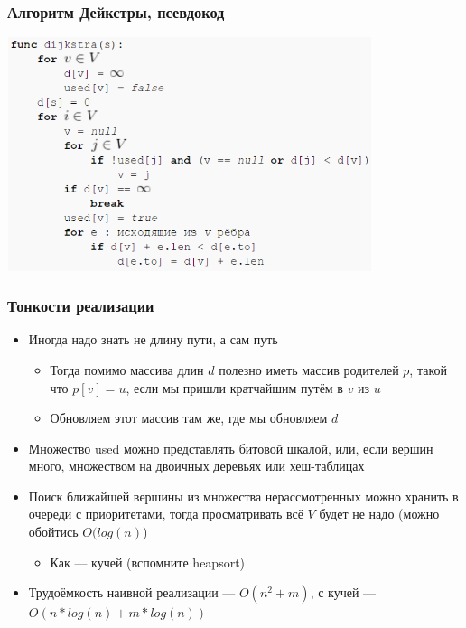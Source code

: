 \documentclass[xetex,mathserif,serif]{beamer}
\begin{document}
	\begin{frame}[fragile]
		\frametitle{Алгоритм Дейкстры, псевдокод}
		\begin{center}
			\includegraphics[width=0.8\textwidth]{dijkstra-pseudocode.png}
		\end{center}
	\end{frame}

	\begin{frame}
		\frametitle{Тонкости реализации}
		\begin{itemize}
			\item Иногда надо знать не длину пути, а сам путь
			\begin{itemize}
				\item Тогда помимо массива длин $d$ полезно иметь массив родителей $p$, такой что $p[v] = u$, если мы пришли кратчайшим путём в $v$ из $u$
				\item Обновляем этот массив там же, где мы обновляем $d$
			\end{itemize}
			\item Множество used можно представлять битовой шкалой, или, если вершин много, множеством на двоичных деревьях или хеш-таблицах
			\item Поиск ближайшей вершины из множества нерассмотренных можно хранить в очереди с приоритетами, тогда просматривать всё $V$ будет не надо (можно обойтись $O(log(n)$)
			\begin{itemize}
				\item Как --- кучей (вспомните heapsort)
			\end{itemize}
			\item Трудоёмкость наивной реализации --- $O(n^2 + m)$, с кучей --- $O(n * log(n) + m * log(n))$
		\end{itemize}
	\end{frame}
\end{document}
